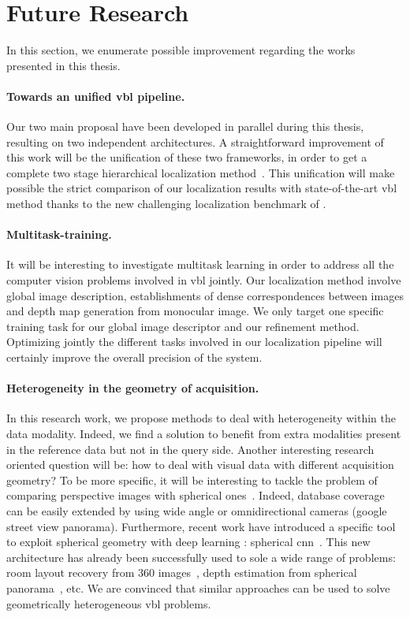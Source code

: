 \section{Future Research}

In this section, we enumerate possible improvement regarding the works presented in this thesis.

\paragraph{Towards an unified \acs{vbl} pipeline.} Our two main proposal have been developed in parallel during this thesis, resulting on two independent architectures. A straightforward improvement of this work will be the unification of these two frameworks, in order to get a complete two stage hierarchical localization method~\citep{Sarlin2018a}. This unification will make possible the strict comparison of our localization results with state-of-the-art \ac{vbl} method thanks to the new challenging localization benchmark of \citet{Sattler2018}.

\paragraph{Multitask-training.} It will be interesting to investigate multitask learning in order to address all the computer vision problems involved in \ac{vbl} jointly. Our localization method involve global image description, establishments of dense correspondences between images and depth map generation from monocular image. We only target one specific training task for our global image descriptor and our refinement method. Optimizing jointly the different tasks involved in our localization pipeline will certainly improve the overall precision of the system.

\paragraph{Heterogeneity in the geometry of acquisition.} In this research work, we propose methods to deal with heterogeneity within the data modality. Indeed, we find a solution to benefit from extra modalities present in the reference data but not in the query side. Another interesting research oriented question will be: how to deal with visual data with different acquisition geometry? To be more specific, it will be interesting to tackle the problem of comparing perspective images with spherical ones~\citep{Iscen2017,Ramalingam2010,Torii2011,Zamir2010,Zamir2014}. Indeed, database coverage can be easily extended by using wide angle or omnidirectional cameras (\eg google street view panorama). Furthermore, recent work have introduced a specific tool to exploit spherical geometry with deep learning : spherical \ac{cnn}~\citep{Cohen2018}. This new architecture has already been successfully used to sole a wide range of problems: room layout recovery from 360 images~\citep{Fernandez-Labrador2019}, depth estimation from spherical panorama~\citep{Zioulis2018}, etc. We are convinced that similar approaches can be used to solve geometrically heterogeneous \ac{vbl} problems.